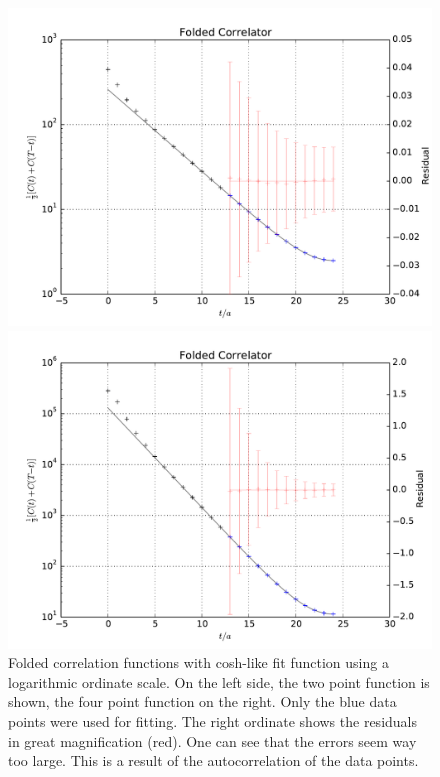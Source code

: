 \documentclass[11pt, english, fleqn, DIV=15, headinclude]{scrartcl}
\begin{document}
\begin{figure}[htbp]
    \centering
    \begin{minipage}[c]{0.49\linewidth}
        \centering
        \includegraphics[width=\linewidth]{plots/A100_24_L24_T48_beta190_mul0100_musig150_mudel190_kappa1632550__ev120__TB2_SO_LI6_new_c2_folded.pdf}
    \end{minipage}
    \hfill
    \begin{minipage}[c]{0.49\linewidth}
        \centering
        \includegraphics[width=\linewidth]{plots/A100_24_L24_T48_beta190_mul0100_musig150_mudel190_kappa1632550__ev120__TB2_SO_LI6_new_c4_folded.pdf}
    \end{minipage}
    \caption{%
        Folded correlation functions with cosh-like fit function using a
        logarithmic ordinate scale. On the left side, the two point function is
        shown, the four point function on the right. Only the blue data points
        were used for fitting. The right ordinate shows the residuals in great
        magnification (red). One can see that the errors seem way too large.
        This is a result of the autocorrelation of the data points.
    }
    \label{fig:folded}
\end{figure}
\end{document}
